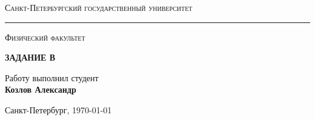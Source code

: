 \begin{titlepage}
	\begin{center}
	{\textsc{Санкт-Петербургский государственный университет}}
	\vskip 2pt \hrule \vskip 3pt
	{\textsc{Физический факультет}}

	\vfill


	{\Large \bfseries ЗАДАНИЕ В}

		
	\vspace{2cm}
	{\large Работу выполнил студент \\[0.5em]{\Large \bfseries Козлов Александр}}

	\end{center}

	\vfill

	\begin{center}
	{Санкт-Петербург, \today}
	\end{center}
\end{titlepage}